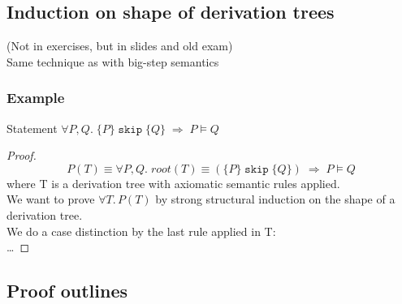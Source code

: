 \documentclass[11.5pt]{article}
\def\skipt{\texttt{skip}}
\begin{document}
\subsection{Induction on shape of derivation trees}
(Not in exercises, but in slides and old exam) \\
Same technique as with big-step semantics
\subsubsection{Example}
Statement $\forall P, Q. \; \{P\} \; \skipt \; \{Q\} \; \Rightarrow \; P \vDash Q$
\begin{proof}
    $$P(T)\equiv \forall P, Q. \; root(T)\equiv(\{P\} \; \skipt \; \{Q\}) \; \Rightarrow \; P \vDash Q$$
    where T is a derivation tree with axiomatic semantic rules applied. \\
    We want to prove $\forall T. \, P(T)$ by strong structural induction on the shape of a derivation tree. \\
    We do a case distinction by the last rule applied in T: \\
    \dots 
\end{proof}



\subsection{Proof outlines}
\end{document}
